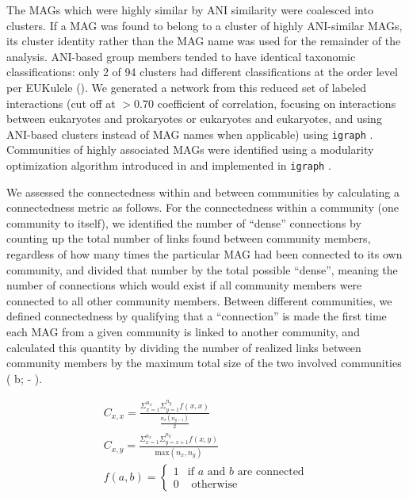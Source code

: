 \documentclass[12pt]{article}
\numberwithin{equation}{section}
\begin{document}
The MAGs which were highly similar by ANI similarity were coalesced into clusters. If a MAG was found to belong to a cluster of highly ANI-similar MAGs, its cluster identity rather than the MAG name was used for the remainder of the analysis. ANI-based group members tended to have identical taxonomic classifications: only 2 of 94 clusters had different classifications at the order level per EUKulele (). We generated a network from this reduced set of labeled interactions (cut off at $>0.70$ coefficient of correlation, focusing on interactions between eukaryotes and prokaryotes or eukaryotes and eukaryotes, and using ANI-based clusters instead of MAG names when applicable) using \texttt{igraph} \citep{igraph,teamr}. Communities of highly associated MAGs were identified using a modularity optimization algorithm introduced in \cite{blondel2008fast} and implemented in \texttt{igraph} \citep{igraph}.

We assessed the connectedness within and between communities by calculating a connectedness metric as follows. For the connectedness within a community (one community to itself), we identified the number of ``dense'' connections by counting up the total number of links found between community members, regardless of how many times the particular MAG had been connected to its own community, and divided that number by the total possible ``dense'', meaning the number of connections which would exist if all community members were connected to all other community members. Between different communities, we defined connectedness by qualifying that a ``connection'' is made the first time each MAG from a given community is linked to another community, and calculated this quantity by dividing the number of realized links between community members by the maximum total size of the two involved communities ( b;  - ). 

\begin{gather}\label{eq:connect}
    C_{x,x} = \frac{\Sigma_{x=1}^{n_x} \Sigma_{y=1}^{n_y} f(x,x)}{\frac{n_x (n_{y-1})}{2}} \\
    C_{x,y} = \frac{\Sigma_{x=1}^{n_x} \Sigma_{y=x+1}^{n_y} f(x,y)}{\textrm{max}(n_x,n_y)} \\
    f(a,b) = \begin{cases}
       1 & \textrm{if } a \textrm{ and } b \textrm{ are connected} \\
       0 & \textrm{ otherwise} \label{eq:connectfinal}
    \end{cases} 
\end{gather}
\end{document}
